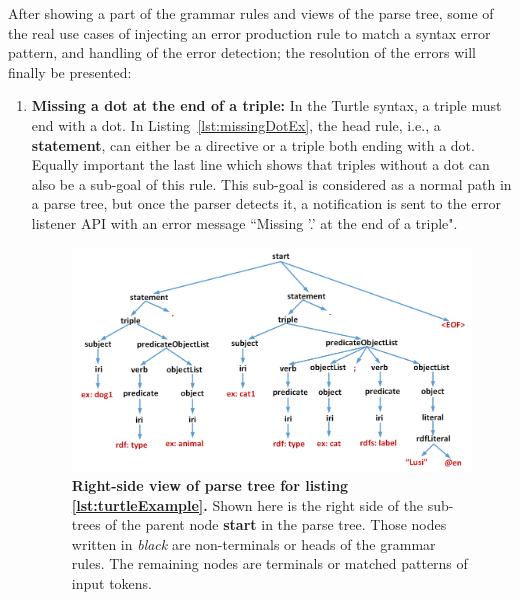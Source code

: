 After showing a part of the grammar rules and views of the parse tree, some of the real use cases of injecting an error production rule to match a syntax error pattern, and handling of the error detection; the resolution of the errors will finally be presented:
\begin{enumerate}
    \item \textbf{Missing a dot at the end of a triple:} In the Turtle syntax, a triple must end with a dot. 
    In Listing~\ref{lst:missingDotEx}, the head rule, i.e., a \textbf{statement}, can either be a directive or a triple both ending with a dot. 
    Equally important the last line which shows that triples without a dot can also be a sub-goal of this rule. 
    This sub-goal is considered as a normal path in a parse tree, but once the parser detects it, a notification is sent to the error listener API with an error message ``Missing ’.’ at the end of a triple".  
    \begin{figure}
		\includegraphics[width=1\linewidth]{images/implementationParseTreeRight.png}
	\caption{\textbf{Right-side view of parse tree  for listing \ref{lst:turtleExample}.} Shown here is the right side of the sub-trees of the parent node \textbf{start} in the parse tree. Those nodes written in \emph{black} are non-terminals or heads of the grammar rules. The remaining nodes are terminals or matched patterns of input tokens.}
	\label{Fig:implementationParseTreeRight}

\end{figure}
    

\end{enumerate}
